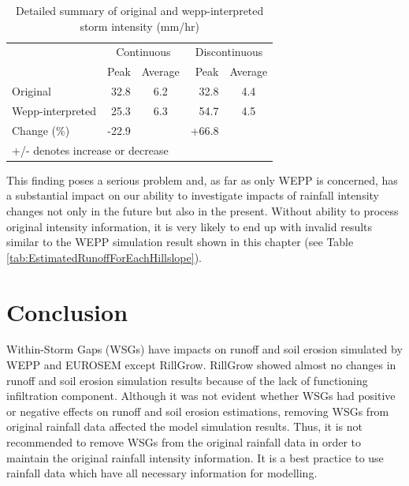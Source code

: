 \begin{table}[htbp]
  \caption{Detailed summary of original and wepp-interpreted storm intensity
(mm/hr)}
\begin{tabular}{lrcrc}
  \toprule
 & \multicolumn{2}{c}{Continuous} & \multicolumn{2}{c}{Discontinuous} \\
  \cmidrule(r){2-3} \cmidrule(l){4-5}
 & Peak & Average & Peak & Average \\ \midrule
Original & 32.8 & 6.2  & 32.8 & 4.4 \\
Wepp-interpreted & 25.3 & 6.3 &  54.7 & 4.5 \\
Change (\%) & -22.9 &  & +66.8 &  \\
  \bottomrule
\multicolumn{5}{p{8cm}}{+/- denotes increase or decrease}
\end{tabular}
\label{tab:summaryofweppchangedstormdetails}
\end{table}

This finding poses a serious problem and, as far as only WEPP is concerned, has
a substantial impact on our ability to investigate impacts of rainfall intensity
changes not only in the future but also in the present. Without ability to
process original intensity information, it is very likely to end up with invalid
results similar to the WEPP simulation result shown in this chapter (see Table
\ref{tab:EstimatedRunoffForEachHillslope}).

\section{Conclusion}
\label{sec:InterStormPeriodsWithinAStormConclusion}

Within-Storm Gaps (WSGs) have impacts on runoff and soil erosion simulated by
WEPP and EUROSEM except RillGrow. RillGrow showed almost no changes in
runoff and soil erosion simulation results because of the lack of functioning
infiltration component. Although it was not evident whether WSGs had positive
or negative effects on runoff and soil erosion estimations, removing WSGs from
original rainfall data affected the model simulation results. Thus, it is not
recommended to remove WSGs from the original rainfall data in order to
maintain the original rainfall intensity information. It is a best practice to
use rainfall data which have all necessary information for modelling.

